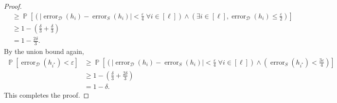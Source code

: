 \documentclass[letterpaper, reqno,11pt]{article}
\newcommand{\PP}{\mathop{{}\mathbb{P}}}
\DeclareMathOperator{\error}{error}
\begin{document}
\begin{enumerate}
\begin{proof}
\begin{align*}
      &\geq \PP\left[\left(\left|\error_{\mathcal D}\left(h_i\right) - \error_S\left(h_i\right)\right| < \frac{\varepsilon}{4} \;\forall i \in [\ell]\right) \wedge \left(\exists i \in [\ell], \error_{\mathcal D}\left(h_i\right) \leq \frac{\varepsilon}{2}\right)\right] \\
      &\geq 1 - \left(\frac{\delta}{3} + \frac{\delta}{3}\right) \\
      &= 1 - \frac{2\delta}{3}.
    \end{align*}
    By the union bound again,
    \begin{align*}
      \PP\left[\error_{\mathcal D}\left(h_{i^*}\right) < \varepsilon\right] &\geq \PP\left[\left(\left|\error_{\mathcal D}\left(h_i\right) - \error_S\left(h_i\right)\right| < \frac{\varepsilon}{4} \;\forall i \in [\ell]\right) \wedge \left(\error_S\left(h_{i^*}\right) < \frac{3\varepsilon}{4}\right)\right] \\
      &\geq 1 - \left(\frac{\delta}{3} + \frac{2\delta}{3}\right) \\
      &= 1 - \delta.
    \end{align*}
    This completes the proof.
  \end{proof}
\end{enumerate}
\end{document}
